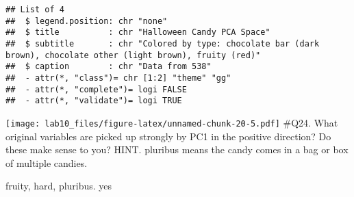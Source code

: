 \documentclass[
]{article}
\newenvironment{Shaded}{\begin{snugshade}}{\end{snugshade}}
\newcommand{\DataTypeTok}[1]{\textcolor[rgb]{0.13,0.29,0.53}{#1}}
\newcommand{\DecValTok}[1]{\textcolor[rgb]{0.00,0.00,0.81}{#1}}
\newcommand{\KeywordTok}[1]{\textcolor[rgb]{0.13,0.29,0.53}{\textbf{#1}}}
\newcommand{\NormalTok}[1]{#1}
\newcommand{\OperatorTok}[1]{\textcolor[rgb]{0.81,0.36,0.00}{\textbf{#1}}}
\newcommand{\StringTok}[1]{\textcolor[rgb]{0.31,0.60,0.02}{#1}}
\begin{document}
\begin{verbatim}
## List of 4
##  $ legend.position: chr "none"
##  $ title          : chr "Halloween Candy PCA Space"
##  $ subtitle       : chr "Colored by type: chocolate bar (dark brown), chocolate other (light brown), fruity (red)"
##  $ caption        : chr "Data from 538"
##  - attr(*, "class")= chr [1:2] "theme" "gg"
##  - attr(*, "complete")= logi FALSE
##  - attr(*, "validate")= logi TRUE
\end{verbatim}

\begin{Shaded}
\end{Shaded}

\texttt{[image: lab10\_files/figure-latex/unnamed-chunk-20-5.pdf]} \#Q24.
What original variables are picked up strongly by PC1 in the positive
direction? Do these make sense to you? HINT. pluribus means the candy
comes in a bag or box of multiple candies.

fruity, hard, pluribus. yes
\end{document}
